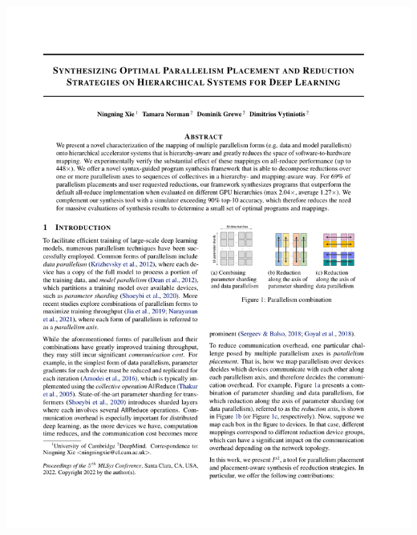 \documentclass[12pt,aspectratio=169]{beamer}
\begin{document}
\begin{frame}
\begin{columns}
\begin{column}{0.45\textwidth}
                \includegraphics[page=2,trim=2.2cm 22.8cm 14cm 2.4cm,clip,scale=0.95]{p2.pdf}
            \end{column}
        \end{columns}
    \end{frame}
\end{document}
